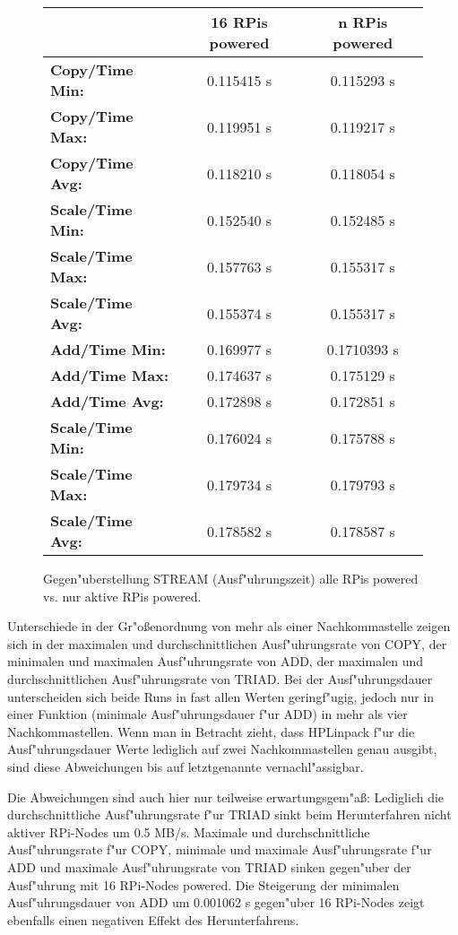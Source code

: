 \begin{figure}[htb]
  \centering
  \begin{tabular}{|l|c|c|}
    \hline 
	& \textbf{16 RPis powered} & \textbf{n RPis powered}\\ 
    \hline 
    \textbf{Copy/Time Min:} & 0.115415 s & 0.115293 s \\
    \hline 
    \textbf{Copy/Time Max:} &  0.119951 s & 0.119217 s \\
    \hline
    \textbf{Copy/Time Avg:} & 0.118210 s & 0.118054 s \\
 	\hline 
   	\textbf{Scale/Time Min:} & 0.152540 s & 0.152485 s \\
 	\hline 
   	\textbf{Scale/Time Max:} & 0.157763 s & 0.155317 s \\
 	\hline 
 	\textbf{Scale/Time Avg:} & 0.155374 s & 0.155317 s \\
 	\hline 
   	\textbf{Add/Time Min:} & 0.169977 s & 0.1710393 s \\
  	\hline 
   	\textbf{Add/Time Max:} & 0.174637 s & 0.175129 s \\
 	\hline 
   	\textbf{Add/Time Avg:} & 0.172898 s & 0.172851 s \\
 	\hline 	
   	\textbf{Scale/Time Min:} & 0.176024 s & 0.175788 s \\
 	\hline 
   	\textbf{Scale/Time Max:} & 0.179734 s & 0.179793 s \\
 	\hline 
 	\textbf{Scale/Time Avg:} & 0.178582 s & 0.178587 s \\
 	\hline
 	\end{tabular}
  \caption{Gegen"uberstellung STREAM (Ausf"uhrungszeit) alle RPis powered vs. nur aktive RPis powered.}\label{fig:stream-vgl2}
\end{figure}

Unterschiede in der Gr"o\ss enordnung von mehr als einer Nachkommastelle zeigen sich in der maximalen und durchschnittlichen Ausf"uhrungsrate von COPY, der minimalen und maximalen Ausf"uhrungsrate von ADD, der maximalen und durchschnittlichen Ausf"uhrungsrate von TRIAD. Bei der Ausf"uhrungsdauer unterscheiden sich beide Runs in fast allen Werten geringf"ugig, jedoch nur in einer Funktion (minimale Ausf"uhrungsdauer f"ur ADD) in mehr als vier Nachkommastellen. Wenn man in Betracht zieht, dass HPLinpack f"ur die Ausf"uhrungsdauer Werte lediglich auf zwei Nachkommastellen genau ausgibt, sind diese Abweichungen bis auf letztgenannte vernachl"assigbar. 

Die Abweichungen sind auch hier nur teilweise erwartungsgem"a\ss : Lediglich die durchschnittliche Ausf"uhrungsrate f"ur TRIAD sinkt beim Herunterfahren nicht aktiver RPi-Nodes um 0.5 MB/s. Maximale und durchschnittliche Ausf"uhrungsrate f"ur COPY, minimale und maximale Ausf"uhrungsrate f"ur ADD und maximale Ausf"uhrungsrate von TRIAD sinken gegen"uber der Ausf"uhrung mit 16 RPi-Nodes powered.  Die Steigerung der minimalen Ausf"uhrungsdauer von ADD um 0.001062 s gegen"uber 16 RPi-Nodes zeigt ebenfalls einen negativen Effekt des Herunterfahrens.

